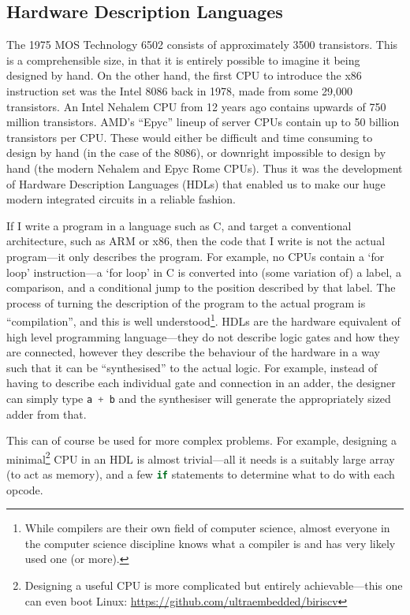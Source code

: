 \documentclass[12pt]{article}
\begin{document}
\subsection{Hardware Description Languages}

The 1975 MOS Technology 6502 consists of approximately 3500 transistors. This is a comprehensible size, in that it is entirely possible to imagine it being designed by hand. On the other hand, the first CPU to introduce the x86 instruction set was the Intel 8086 back in 1978, made from some 29,000 transistors. An Intel Nehalem CPU from 12 years ago contains upwards of 750 million transistors. AMD's ``Epyc'' lineup of server CPUs contain up to 50 billion transistors per CPU. These would either be difficult and time consuming to design by hand (in the case of the 8086), or downright impossible to design by hand (the modern Nehalem and Epyc Rome CPUs). Thus it was the development of Hardware Description Languages (HDLs) that enabled us to make our huge modern integrated circuits in a reliable fashion.

If I write a program in a language such as C, and target a conventional architecture, such as ARM or x86, then the code that I write is not the actual program---it only describes the program. For example, no CPUs contain a `for loop' instruction---a `for loop' in C is converted into (some variation of) a label, a comparison, and a conditional jump to the position described by that label. The process of turning the description of the program to the actual program is ``compilation'', and this is well understood\footnote{While compilers are their own field of computer science, almost everyone in the computer science discipline knows what a compiler is and has very likely used one (or more).}.
HDLs are the hardware equivalent of high level programming language---they do not describe logic gates and how they are connected, however they describe the behaviour of the hardware in a way such that it can be ``synthesised'' to the actual logic. For example, instead of having to describe each individual gate and connection in an adder, the designer can simply type \lstinline[language=Verilog]|a + b| and the synthesiser will generate the appropriately sized adder from that.

This can of course be used for more complex problems. For example, designing a minimal\footnote{Designing a useful CPU is more complicated but entirely achievable---this one can even boot Linux: \url{https://github.com/ultraembedded/biriscv}} CPU in an HDL is almost trivial---all it needs is a suitably large array (to act as memory), and a few \lstinline[language=Verilog]|if| statements to determine what to do with each opcode.
\end{document}
